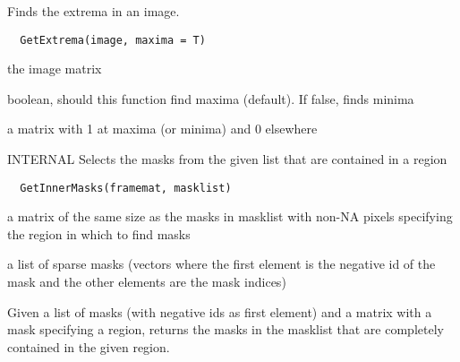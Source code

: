 \documentclass[a4paper]{book}
\begin{document}
%
\begin{Description}\relax
Finds the extrema in an image.
\end{Description}
%
\begin{Usage}
\begin{verbatim}
  GetExtrema(image, maxima = T)
\end{verbatim}
\end{Usage}
%
\begin{Arguments}
\begin{ldescription}
\item[\code{image}] the image matrix

\item[\code{maxima}] boolean, should this function find maxima
(default).  If false, finds minima
\end{ldescription}
\end{Arguments}
%
\begin{Value}
a matrix with 1 at maxima (or minima) and 0 elsewhere
\end{Value}
%
\begin{Description}\relax
INTERNAL Selects the masks from the given list that are
contained in a region
\end{Description}
%
\begin{Usage}
\begin{verbatim}
  GetInnerMasks(framemat, masklist)
\end{verbatim}
\end{Usage}
%
\begin{Arguments}
\begin{ldescription}
\item[\code{framemat}] a matrix of the same size as the masks in
masklist with non-NA pixels specifying the region in
which to find masks

\item[\code{masklist}] a list of sparse masks (vectors where the
first element is the negative id of the mask and the
other elements are the mask indices)
\end{ldescription}
\end{Arguments}
%
\begin{Details}\relax
Given a list of masks (with negative ids as first
element) and a matrix with a mask specifying a region,
returns the masks in the masklist that are completely
contained in the given region.
\end{Details}
\end{document}
